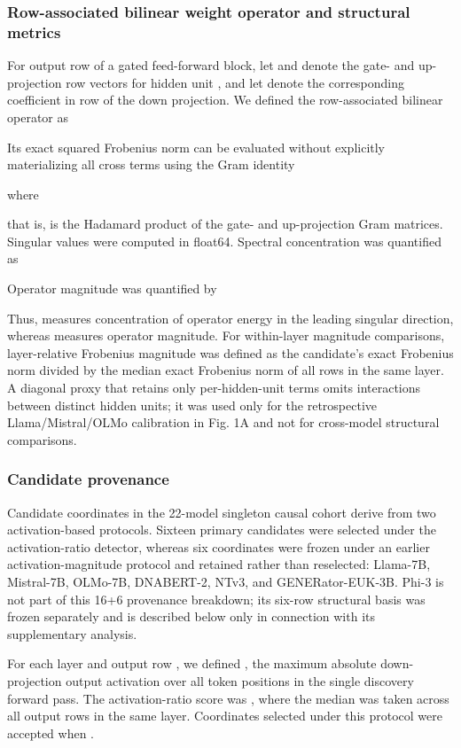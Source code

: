 \documentclass[11pt]{article}
\begin{document}
\subsubsection*{Row-associated bilinear weight operator and structural metrics}
For output row  of a gated feed-forward block, let  and  denote the gate- and up-projection row vectors for hidden unit , and let  denote the corresponding coefficient in row  of the down projection. We defined the row-associated bilinear operator as

Its exact squared Frobenius norm can be evaluated without explicitly materializing all cross terms using the Gram identity

where

that is,  is the Hadamard product of the gate- and up-projection Gram matrices. Singular values  were computed in float64. Spectral concentration was quantified as

Operator magnitude was quantified by

Thus,  measures concentration of operator energy in the leading singular direction, whereas  measures operator magnitude. For within-layer magnitude comparisons, layer-relative Frobenius magnitude was defined as the candidate’s exact Frobenius norm divided by the median exact Frobenius norm of all rows in the same layer. A diagonal proxy that retains only per-hidden-unit terms omits interactions between distinct hidden units; it was used only for the retrospective Llama/Mistral/OLMo calibration in Fig. 1A and not for cross-model structural comparisons.

\subsubsection*{Candidate provenance}
Candidate coordinates in the 22-model singleton causal cohort derive from two activation-based protocols. Sixteen primary candidates were selected under the activation-ratio detector, whereas six coordinates were frozen under an earlier activation-magnitude protocol and retained rather than reselected: Llama-7B, Mistral-7B, OLMo-7B, DNABERT-2, NTv3, and GENERator-EUK-3B. Phi-3 is not part of this 16+6 provenance breakdown; its six-row structural basis was frozen separately and is described below only in connection with its supplementary analysis.

For each layer  and output row , we defined , the maximum absolute down-projection output activation over all token positions  in the single discovery forward pass. The activation-ratio score was , where the median was taken across all output rows  in the same layer. Coordinates selected under this protocol were accepted when .
\end{document}
